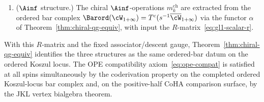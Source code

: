 \begin{theorem}
\begin{enumerate}[label=\textup{(\Roman*)}]
\begin{equation}
 \binom{n-k-1}{m-1}\,
 z^{n-k-m}\,
 \psi_k \otimes \psi_m,
 \end{equation}
 where $\psi_0 = 1$.
\item \textup{($\Ainf$ structure.)}
 The chiral $\Ainf$-operations $m_k^{\mathrm{ch}}$ are
 extracted from the ordered bar complex
 $\Barord(\cW_{1+\infty})
 = T^c(s^{-1}\overline{\cW}_{1+\infty})$ via the functor
 $\alpha$ of Theorem~\textup{\ref{thm:chiral-qg-equiv}},
 with input the $R$-matrix~\eqref{eq:gl1-scalar-r}.
\end{enumerate}
With this $R$-matrix and the fixed associator/descent gauge,
Theorem~\textup{\ref{thm:chiral-qg-equiv}} identifies the three
structures as the same ordered-bar datum on the ordered Koszul locus. The OPE
compatibility axiom~\eqref{eq:ope-compat} is satisfied at
all spins simultaneously by the coderivation property on the
completed ordered Koszul-locus bar complex and, on the positive-half CoHA
comparison surface, by the JKL vertex bialgebra theorem.
\end{theorem}

